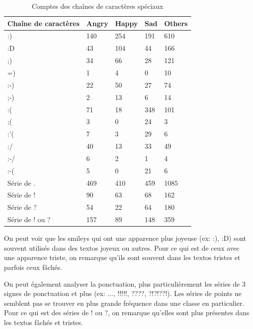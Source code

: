 \begin{longtable}[c]{@{}lllll@{}}
	\caption{Comptes des chaînes de caractères spéciaux}
	\label{table:binettes}\\
	\toprule
	Chaîne de caractères & Angry & Happy & Sad & Others \\* \midrule
	\endhead
	\bottomrule
	\endfoot
	\endlastfoot
	:)                   & 140   & 254   & 191 & 610    \\
	:D                   & 43    & 104   & 44  & 166    \\
	;)                   & 34    & 66    & 28  & 121    \\
	=)                   & 1     & 4     & 0   & 10     \\
	:-)                  & 22    & 50    & 27  & 74     \\
	;-)                  & 2     & 13    & 6   & 14     \\
	:(                   & 71    & 18    & 348 & 101    \\
	;(                   & 3     & 0     & 24  & 3      \\
	:'(                  & 7     & 3     & 29  & 6      \\
	:/                   & 40    & 13    & 33  & 49     \\
	:-/                  & 6     & 2     & 1   & 4      \\
	:-(                  & 5     & 0     & 21  & 6      \\
	Série de .           & 469   & 410   & 459 & 1085   \\
	Série de !           & 90    & 63    & 68  & 162    \\
	Série de ?           & 54    & 22    & 64  & 180    \\
	Série de ! ou ?      & 157   & 89    & 148 & 359    \\* \bottomrule
\end{longtable}

On peut voir que les smileys qui ont une apparence plus joyeuse (ex: :), :D) sont souvent utilisés dans des textos joyeux ou autres. Pour ce qui est de ceux avec une apparence triste, on remarque qu'ils sont souvent dans les textos tristes et parfois ceux fâchés.

On peut également analyser la ponctuation, plus particulièrement les séries de 3 signes de ponctuation et plus (ex: ..., !!!!!, ????, ?!?!??!). Les séries de points ne semblent pas se trouver en plus grande fréquence dans une classe en particulier. Pour ce qui est des séries de ! ou ?, on remarque qu'elles sont plus présentes dans les textos fâchés et tristes.

